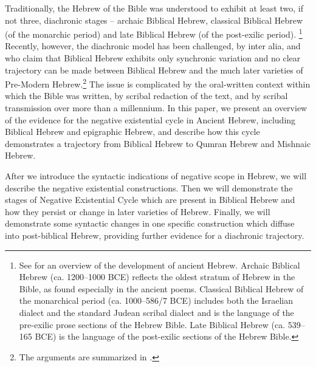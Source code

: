 \documentclass[output=paper,colorlinks,citecolor=brown,draft,draftmode]{langscibook}
\begin{document}
%
Traditionally, the Hebrew of the Bible was understood to exhibit at least
two, if not three, diachronic stages -- archaic Biblical Hebrew, classical
Biblical Hebrew (of the monarchic period) and late Biblical Hebrew (of the
post-exilic period).%
%
\footnote{See \citet*[1--6]{MerweNaude2017} for an overview of the
development of ancient Hebrew. Archaic Biblical Hebrew (ca. 1200--1000 BCE)
reflects the oldest stratum of Hebrew in the Bible, as found especially in
the ancient poems. Classical Biblical Hebrew of the monarchical period (ca.
1000--586\slash 7 BCE) includes both the Israelian dialect and the standard
Judean scribal dialect and is the language of the pre-exilic prose sections
of the Hebrew Bible. Late Biblical Hebrew (ca.  539--165 BCE) is the
language of the post-exilic sections of the Hebrew Bible.} Recently,
however, the diachronic model has been challenged, by inter alia,
\textcite{YoungRezetko2008} and \textcite{RezetkoYoung2014} who claim that
Biblical Hebrew exhibits only synchronic variation and no clear trajectory
can be made between Biblical Hebrew and the much later varieties of
Pre-Modern Hebrew.\footnote{The arguments are summarized in
\citet{NaudeMiller2016a,NaudeMiller2016b}.}
The issue is complicated by
the oral-written context within which the Bible was written, by scribal
redaction of the text, and by scribal transmission over more than a
millennium. In this paper, we present an overview of the evidence for the
negative existential cycle in Ancient Hebrew, including Biblical Hebrew and
epigraphic Hebrew, and describe how this cycle demonstrates a trajectory
from Biblical Hebrew to Qumran Hebrew and Mishnaic Hebrew.

After we introduce the syntactic indications of negative scope in Hebrew,
we will describe the negative existential constructions. Then we will
demonstrate the stages of  Negative Existential Cycle
which are present in Biblical Hebrew and how they persist or change in
later varieties of Hebrew. Finally, we will demonstrate some syntactic
changes in one specific construction which diffuse into post-biblical
Hebrew, providing further evidence for a diachronic trajectory. 
\end{document}
